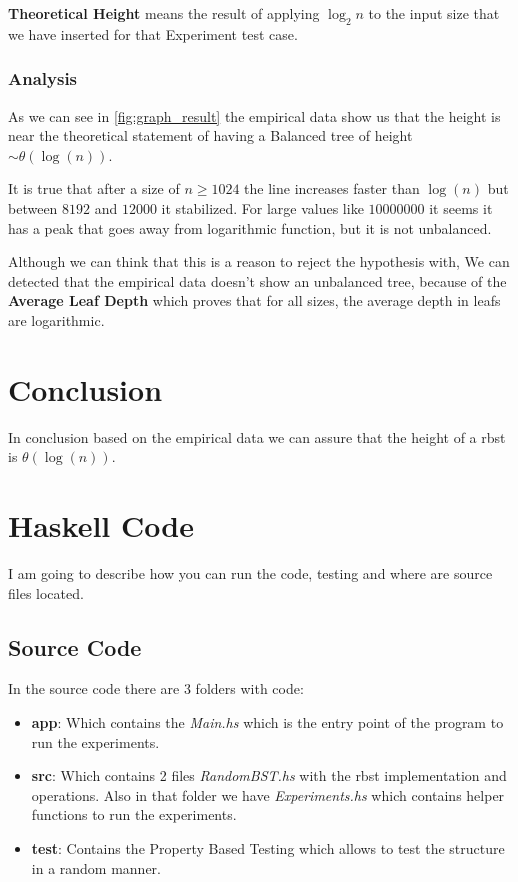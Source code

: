 \documentclass[12pt, a4paper]{article}
\begin{document}
  \textbf{Theoretical Height} means the result of applying $\log_2{n}$ to the input size that we have inserted for that Experiment test case.

\subsubsection{Analysis}
As we can see in \ref{fig:graph_result} the empirical data show us that the height is near the theoretical statement of having a Balanced tree of height $\sim \theta(\log(n))$.

It is true that after a size of $n \geq 1024$ the line increases faster than $\log(n)$ but between $8192$ and $12000$ it stabilized. For large values like $10000000$ it seems it has a peak that goes away from logarithmic function, but it is not unbalanced.

Although we can think that this is a reason to reject the hypothesis with, We can detected that the empirical data doesn't show an unbalanced tree, because of the \textbf{Average Leaf Depth} which proves that for all sizes, the average depth in leafs are logarithmic.

\section{Conclusion}
In conclusion based on the empirical data we can assure that the height of a \acrfull{rbst} is $\theta(\log(n))$.

\appendix
\section{Haskell Code}
I am going to describe how you can run the code, testing and where are source files located.

\subsection{Source Code}
In the source code there are 3 folders with code:

\begin{itemize}
  \item \textbf{app}: Which contains the \textit{Main.hs} which is the entry point of the program to run the experiments.
  \item \textbf{src}: Which contains 2 files \textit{RandomBST.hs} with the \acrshort{rbst} implementation and operations. Also in that folder we have \textit{Experiments.hs} which contains helper functions to run the experiments.
  \item \textbf{test}: Contains the Property Based Testing which allows to test the structure in a random manner.
\end{itemize}
\end{document}
